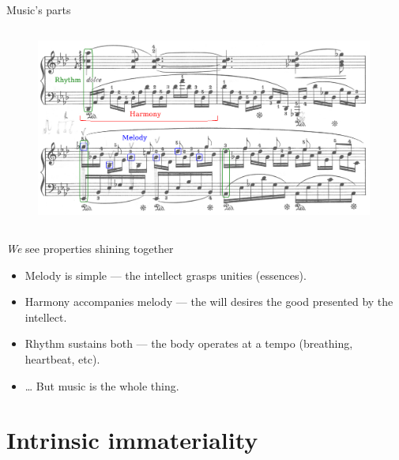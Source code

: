 \documentclass[xcolor=dvipsnames]{beamer}
\begin{document}
\begin{frame}[fragile]{Music's parts}
  \begin{columns}[T] %
    \begin{column}{0.99\textwidth}
      \begin{figure}[H]
        \centering
        \includegraphics[width=0.99\textwidth]{chopin-ballade-rhm}
      \end{figure}
    \end{column}%
  \end{columns}
\end{frame}


\begin{frame}[fragile]{\emph{We} see properties shining together}
  \begin{itemize}
  \item Melody is simple --- the intellect grasps unities (essences).\vspace{5mm}
  \item Harmony accompanies melody --- the will desires the good presented by the intellect. \vspace{5mm}
  \item Rhythm sustains both --- the body operates at a tempo (breathing, heartbeat, etc). \vspace{5mm}
  \item {\ldots} But music is the whole thing.
  \end{itemize}
\end{frame}



\section{Intrinsic immateriality}
\end{document}
